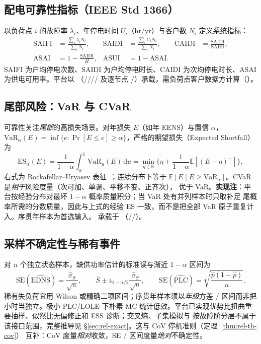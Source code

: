 \subsection{配电可靠性指标（IEEE Std 1366）}\label{sec:rel-th-1366}
以负荷点 $i$ 的故障率 $\lambda_i$、年停电时间 $U_i$（hr/yr）与客户数 $N_i$ 定义系统指标：
\begin{align}
 \mathrm{SAIFI}&=\frac{\sum_i\lambda_iN_i}{\sum_iN_i},&
 \mathrm{SAIDI}&=\frac{\sum_iU_iN_i}{\sum_iN_i},&
 \mathrm{CAIDI}&=\frac{\mathrm{SAIDI}}{\mathrm{SAIFI}},\\
 \mathrm{ASAI}&=1-\frac{\mathrm{SAIDI}}{H},&
 \mathrm{ASUI}&=1-\mathrm{ASAI}.&&
\end{align}
SAIFI 为户均停电次数、SAIDI 为户均停电时长、CAIDI 为次均停电时长、ASAI 为供电可用率。平台以
（//// 及逐节点
/）承载，需负荷点客户数据方计算（）。

\subsection{尾部风险：VaR 与 CVaR}\label{sec:rel-th-var}
可靠性关注\emph{尾部}的高损失场景。对年损失 $E$（如年 EENS）与置信 $\alpha$，
$\mathrm{VaR}_\alpha(E)=\inf\{e:\Pr[E\le e]\ge\alpha\}$，严格的期望损失（Expected Shortfall）为
\begin{equation}
 \mathrm{ES}_\alpha(E)=\frac1{1-\alpha}\int_\alpha^1\mathrm{VaR}_u(E)\,\mathrm du
 =\min_{\eta\in\mathbb R}\Big\{\eta+\frac1{1-\alpha}\mathbb E[(E-\eta)^+]\Big\},
 \label{eq:rel-th-cvar}
\end{equation}
右式为 Rockafellar--Uryasev 表征~\cite{rel:rockafellar}；连续分布下等于
$\mathbb E[E\mid E\ge\mathrm{VaR}_\alpha]$。CVaR 是\emph{相干}风险度量（次可加、单调、平移不变、正齐次），
优于 VaR。\textbf{实现注}：平台按经验分布对最坏 $1-\alpha$ 概率质量积分；当 VaR 处有并列样本时只取补足
尾概率所需的分数质量，因此与上式的经验 ES 一致，而不是把全部 VaR 原子重复计入。序贯年样本为首选输入。
承载于 
（//）。

\subsection{采样不确定性与稀有事件}\label{sec:rel-th-uncert}
对 $n$ 个独立状态样本，缺供功率估计的标准误与渐近 $1-\alpha$ 区间为
\begin{equation}
 \mathrm{SE}(\widehat{\mathrm{EDNS}})=\frac{\widehat\sigma_S}{\sqrt n},\qquad
 \bar S\pm z_{1-\alpha/2}\frac{\widehat\sigma_S}{\sqrt n},\qquad
 \mathrm{SE}(\widehat{\mathrm{PLC}})=\sqrt{\frac{\widehat p(1-\widehat p)}{n}}.
\end{equation}
稀有失负荷宜用 Wilson 或精确二项区间；序贯年样本须以\emph{年级}方差 / 区间而非把小时当独立。极小
PLC/LOLE 下朴素 MC 统计低效。平台已实现优势比扭曲重要抽样、似然比无偏修正和 ESS 诊断；交叉熵、子集模拟与
按故障阶分层不属于该接口范围，完整推导见 \S\ref{sec:rel-exact}。这与 CoV 停机准则（定理~\ref{thm:rel-th-cov}）
互补：CoV 度量\emph{相对}收敛，SE / 区间度量\emph{绝对}不确定性。

